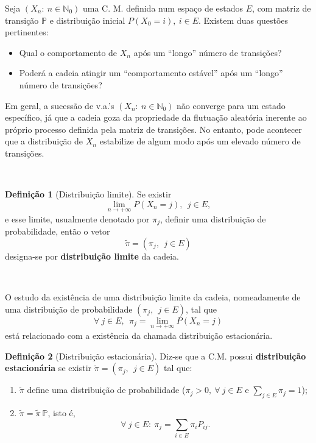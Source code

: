 \documentclass[
  11pt,
  a4paper,
]{book}
\theoremstyle{definition}
\newtheorem{definition}{Definição}[chapter]
\theoremstyle{definition}
\theoremstyle{definition}
\theoremstyle{definition}
\theoremstyle{remark}
\begin{document}
Seja \((X_n: ~n \in \mathbb{N}_0)\) uma C. M. definida num espaço de estados \(E\), com matriz de transição \(\mathbb{P}\) e distribuição inicial \(P(X_0=i), ~i \in E\). Existem duas questões pertinentes:

\begin{itemize}
\item
  Qual o comportamento de \(X_n\) após um ``longo'' número de transições?
\item
  Poderá a cadeia atingir um ``comportamento estável'' após um ``longo'' número de transições?
\end{itemize}

Em geral, a sucessão de v.a.'s \((X_n: ~n \in \mathbb{N}_0)\) não converge para um estado específico, já que a cadeia goza da propriedade da flutuação aleatória inerente ao próprio processo definida pela matriz de transições. No entanto, pode acontecer que a distribuição de \(X_n\) estabilize de algum modo após um elevado número de transições.

\(\,\)

\begin{definition}[Distribuição limite]
Se existir
\[\lim\limits_{n \to +\infty} P(X_n=j), ~ ~j \in E,\]
e esse limite, usualmente denotado por \(\pi_j\), definir uma distribuição de probabilidade, então o vetor
\[\tilde{\pi}=(\pi_j, ~ ~j \in E)\]
designa-se por \textbf{distribuição limite} da cadeia.
\end{definition}

\(\,\)

O estudo da existência de uma distribuição limite da cadeia, nomeadamente de uma distribuição de probabilidade \((\pi_j, ~ ~j \in E)\), tal que
\[\forall ~j \in E,~~ \pi_j=\lim\limits_{n \to +\infty} P(X_n=j)\]
está relacionado com a existência da chamada distribuição estacionária.

\begin{definition}[Distribuição estacionária]

Diz-se que a C.M. possui \textbf{distribuição estacionária} se existir \(\tilde{\pi}=(\pi_j, ~ ~j \in E)\) tal que:

\begin{enumerate}
\def\labelenumi{(\roman{enumi})}
\item
  \(\tilde{\pi}\) define uma distribuição de probabilidade (\(\pi_j>0, ~\forall ~j \in E\) e \(\sum\limits_{j \in E} \pi_j=1\));
\item
  \(\tilde{\pi}=\tilde{\pi}~\mathbb{P}\), isto é,
  \[
  \forall ~j \in E: ~\pi_j = \sum\limits_{i \in E} \pi_i P_{ij}. \label{eq:distest}
  \]
\end{enumerate}

\end{definition}
\end{document}
